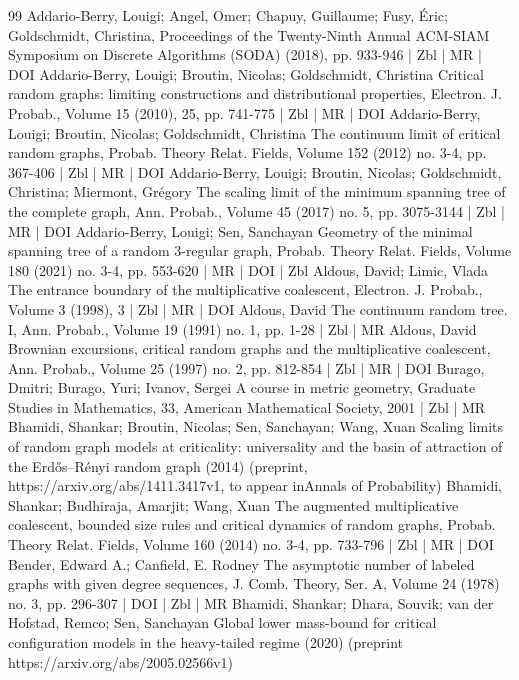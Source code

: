 \documentclass[10pt]{amsart}
\theoremstyle{definition}\newtheorem{defi}[theo]{Definition}\newtheorem{rema}[theo]{Remark}\newtheorem{exam}[theo]{Example}\newtheorem{exem}[theo]{Example}\newtheorem{nota}[theo]{Notation}
\begin{document}
\begin{thebibliography}{99}
Addario-Berry, Louigi; Angel, Omer; Chapuy, Guillaume; Fusy, Éric; Goldschmidt, Christina, Proceedings of the Twenty-Ninth Annual ACM-SIAM Symposium on Discrete Algorithms (SODA) (2018), pp. 933-946 | Zbl | MR | DOI
Addario-Berry, Louigi; Broutin, Nicolas; Goldschmidt, Christina Critical random graphs: limiting constructions and distributional properties, Electron. J. Probab., Volume 15 (2010), 25, pp. 741-775 | Zbl | MR | DOI
Addario-Berry, Louigi; Broutin, Nicolas; Goldschmidt, Christina The continuum limit of critical random graphs, Probab. Theory Relat. Fields, Volume 152 (2012) no. 3-4, pp. 367-406 | Zbl | MR | DOI
Addario-Berry, Louigi; Broutin, Nicolas; Goldschmidt, Christina; Miermont, Grégory The scaling limit of the minimum spanning tree of the complete graph, Ann. Probab., Volume 45 (2017) no. 5, pp. 3075-3144 | Zbl | MR | DOI
Addario-Berry, Louigi; Sen, Sanchayan Geometry of the minimal spanning tree of a random 3-regular graph, Probab. Theory Relat. Fields, Volume 180 (2021) no. 3-4, pp. 553-620 | MR | DOI | Zbl
Aldous, David; Limic, Vlada The entrance boundary of the multiplicative coalescent, Electron. J. Probab., Volume 3 (1998), 3 | Zbl | MR | DOI
Aldous, David The continuum random tree. I, Ann. Probab., Volume 19 (1991) no. 1, pp. 1-28 | Zbl | MR
Aldous, David Brownian excursions, critical random graphs and the multiplicative coalescent, Ann. Probab., Volume 25 (1997) no. 2, pp. 812-854 | Zbl | MR | DOI
Burago, Dmitri; Burago, Yuri; Ivanov, Sergei A course in metric geometry, Graduate Studies in Mathematics, 33, American Mathematical Society, 2001 | Zbl | MR
Bhamidi, Shankar; Broutin, Nicolas; Sen, Sanchayan; Wang, Xuan Scaling limits of random graph models at criticality: universality and the basin of attraction of the Erdős–Rényi random graph (2014) (preprint, https://arxiv.org/abs/1411.3417v1, to appear inAnnals of Probability)
Bhamidi, Shankar; Budhiraja, Amarjit; Wang, Xuan The augmented multiplicative coalescent, bounded size rules and critical dynamics of random graphs, Probab. Theory Relat. Fields, Volume 160 (2014) no. 3-4, pp. 733-796 | Zbl | MR | DOI
Bender, Edward A.; Canfield, E. Rodney The asymptotic number of labeled graphs with given degree sequences, J. Comb. Theory, Ser. A, Volume 24 (1978) no. 3, pp. 296-307 | DOI | Zbl | MR
Bhamidi, Shankar; Dhara, Souvik; van der Hofstad, Remco; Sen, Sanchayan Global lower mass-bound for critical configuration models in the heavy-tailed regime (2020) (preprint https://arxiv.org/abs/2005.02566v1)

\end{thebibliography}
\end{document}
